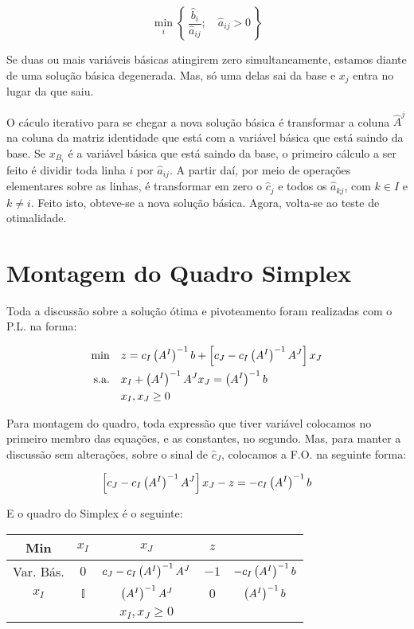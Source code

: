 \[
  \min_{i}  
  \left\{\, 
    \frac
    {
      \widehat{b}_i
    }
    {
      \widehat{a}_{ij}
    }; 
    \quad 
    \widehat{a}_{ij} > 0 
  \,\right\}
\]

\begin{obs}
  Se duas ou mais variáveis básicas atingirem zero simultaneamente, estamos 
  diante de uma solução básica degenerada.
  Mas, só uma delas sai da base e $ x_j $ entra no lugar da que saiu.
\end{obs}

O cáculo iterativo para se chegar a nova solução básica é transformar a coluna
$ \widehat{A}^j $ na coluna da matriz identidade que está com a variável básica
que está saindo da base.
Se $ x_{B_i} $ é a variável básica que está saindo da base, o primeiro cálculo
a ser feito é dividir toda linha $ i $ por $ \widehat{a}_{ij} $.
A partir daí, por meio de operações elementares sobre as linhas, é transformar
em zero o $ \widehat{c}_j $ e todos os $ \widehat{a}_{kj} $, com $ k \in I $ e 
$ k \neq i $.
Feito isto, obteve-se a nova solução básica.
Agora, volta-se ao teste de otimalidade.

\section{Montagem do Quadro Simplex} %

Toda a discussão sobre a solução ótima e pivoteamento foram realizadas com o P.L.
na forma:

\begin{align*}
  \min        \quad & z = c_I \left(A^{I}\right)^{-1} b + \left[c_J - c_I \left(A^{I}\right)^{-1} A^J \right] x_J \\
  \text{s.a.} \quad & x_I + \left(A^{I}\right)^{-1} A^J x_J = \left(A^{I}\right)^{-1} b \\
                    & x_I, x_J \geq 0
\end{align*}

Para montagem do quadro, toda expressão que tiver variável colocamos no primeiro
membro das equações, e as constantes, no segundo.
Mas, para manter a discussão sem alterações, sobre o sinal de $ \widehat{c}_J $,
colocamos a F.O. na seguinte forma:

\[
  \left[c_J - c_I \left(A^{I}\right)^{-1} A^J \right] x_J - z = -c_I \left(A^{I}\right)^{-1} b
\]

E o quadro do Simplex é o seguinte:

\begin{table}[!htbp]
  \centering
  \begin{tabular}{c|ccc|c}
    Min         & $x_I$        & $x_J$                       &  $z$  & \\ \hline
    Var. Bás.   & $0$          & $c_J - c_I \left(A^{I}\right)^{-1} A^{J}$ & $-1$  & $-c_I \left(A^{I}\right)^{-1} b$\\ \hline
    $x_I$       & $\mathbb{I}$ & $\left(A^{I}\right)^{-1} A^J$             & $0$   & $\left(A^{I}\right)^{-1} b$ \\ \hline
                &              & $x_I, x_J \geq 0$           &       &
  \end{tabular}
\end{table}

